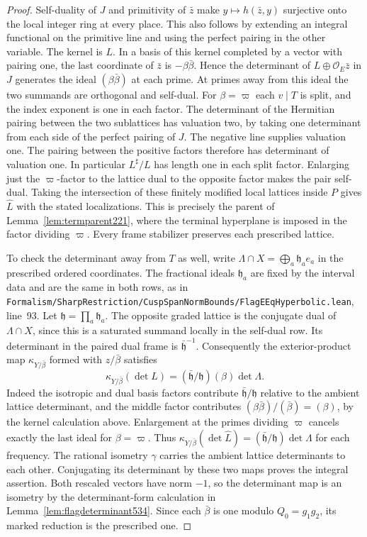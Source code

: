 \documentclass[a4paper,11pt]{article}
\theoremstyle{definition}
\theoremstyle{remark}
\newcommand{\srcloc}[2]{{\small\nolinkurl{#1.lean}}, line~#2}
\numberwithin{equation}{section}
\begin{document}
\begin{proof}
Self-duality of \(J\) and primitivity of \(\bar z\) make
\(y\mapsto h(\bar z,y)\) surjective onto the local integer
ring at every place. This also follows by extending an integral
functional on the primitive line and using the perfect pairing
in the other variable. The kernel is \(L\). In a basis of this
kernel completed by a vector with pairing one, the last
coordinate of \(\bar z\) is \(-\beta\bar\beta\).
Hence the determinant of \(L\oplus\mathcal O_E\bar z\) in \(J\)
generates the ideal \((\beta\bar\beta)\) at each prime. At
primes away from this ideal the two summands are orthogonal and
self-dual. For \(\beta=\varpi\) each \(v\mid T\) is split, and
the index exponent is one in each factor. The determinant of
the Hermitian pairing between the two sublattices has valuation
two, by taking one determinant from each side of the perfect
pairing of \(J\). The negative line supplies valuation one.
The pairing between the positive factors therefore has determinant
of valuation one. In particular \(L^\sharp/L\) has length one
in each split factor. Enlarging just the \(\varpi\)-factor
to the lattice dual to the opposite factor makes the pair
self-dual. Taking the intersection of these finitely modified
local lattices inside \(P\) gives \(\widehat L\) with the
stated localizations. This is precisely the parent of
Lemma~\ref{lem:termparent221}, where the terminal hyperplane is
imposed in the factor dividing \(\varpi\). Every frame
stabilizer preserves each prescribed lattice.

To check the determinant away from \(T\) as well, write
\(\Lambda\cap X=\bigoplus_a\mathfrak h_a e_a\) in the prescribed
ordered coordinates. The fractional ideals \(\mathfrak h_a\)
are fixed by the interval data and are the same in both rows,
as in
\srcloc{Formalism/SharpRestriction/CuspSpanNormBounds/FlagEEqHyperbolic}{93}.
Let \(\mathfrak h=\prod_a\mathfrak h_a\). The opposite graded
lattice is the conjugate dual of \(\Lambda\cap X\), since this
is a saturated summand locally in the self-dual row. Its
determinant in the paired dual frame is
\(\bar{\mathfrak h}^{-1}\). Consequently the exterior-product
map \(\kappa_{Y/\bar\beta}\) formed with \(z/\bar\beta\) satisfies
\[
   \kappa_{Y/\bar\beta}(\det L)
        =(\bar{\mathfrak h}/\mathfrak h)(\beta)\det\Lambda .
\]
Indeed the isotropic and dual basis factors contribute
\(\bar{\mathfrak h}/\mathfrak h\) relative to the ambient
lattice determinant, and the middle factor contributes
\((\beta\bar\beta)/(\bar\beta)=(\beta)\), by the kernel
calculation above. Enlargement at the primes dividing
\(\varpi\) cancels exactly the last ideal for \(\beta=\varpi\).
Thus \(\kappa_{Y/\bar\beta}(\det\widehat L)=
(\bar{\mathfrak h}/\mathfrak h)\det\Lambda\) for each frequency.
The rational isometry \(\gamma\) carries the ambient lattice
determinants to each other. Conjugating its determinant by
these two maps proves the integral assertion. Both rescaled
vectors have norm \(-1\), so the determinant map is an isometry
by the determinant-form calculation in
Lemma~\ref{lem:flagdeterminant534}. Since each \(\bar\beta\) is
one modulo \(Q_0=g_1g_2\), its marked reduction is the
prescribed one.
\end{proof}
\end{document}
